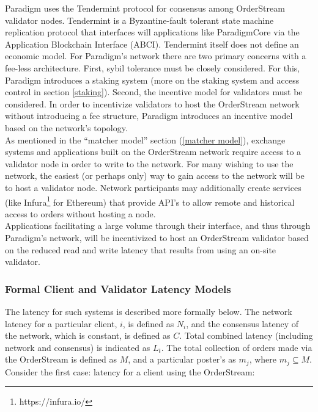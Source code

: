 \documentclass[9pt]{article}
\begin{document}
\noindent Paradigm uses the Tendermint protocol for consensus among OrderStream validator nodes. Tendermint is a Byzantine-fault tolerant state machine replication protocol that interfaces will applications like ParadigmCore via the Application Blockchain Interface (ABCI). Tendermint itself does not define an economic model. For Paradigm’s network there are two primary concerns with a fee-less architecture. First, sybil tolerance must be closely considered. For this, Paradigm introduces a staking system (more on the staking system and access control in section \ref{staking}). Second, the incentive model for validators must be considered. In order to incentivize validators to host the OrderStream network without introducing a fee structure, Paradigm introduces an incentive model based on the network’s topology. \\

\noindent As mentioned in the “matcher model” section (\ref{matcher model}), exchange systems and applications built on the OrderStream network require access to a validator node in order to write to the network. For many wishing to use the network, the easiest (or perhaps only) way to gain access to the network will be to host a validator node. Network participants may additionally create services (like Infura\footnote{https://infura.io/} for Ethereum) that provide API’s to allow remote and historical access to orders without hosting a node. \\

\noindent Applications facilitating a large volume through their interface, and thus through Paradigm’s network, will be incentivized to host an OrderStream validator based on the reduced read and write latency that results from using an on-site validator. 

\subsubsection{Formal Client and Validator Latency Models}\label{latency}
\noindent The latency for such systems is described more formally below. The network latency for a particular client, $i$, is defined as $N_i$, and the consensus latency of the network, which is constant, is defined as $C$. Total combined latency (including network and consensus) is indicated as $L_t$. The total collection of orders made via the OrderStream is defined as $M$, and a particular poster’s as $m_j$, where $m_j \subseteq M$. Consider the first case: latency for a client using the OrderStream:
\end{document}
